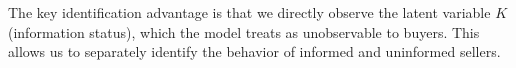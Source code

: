 The key identification advantage is that we directly observe the latent variable $K$ (information status), which the model treats as unobservable to buyers. This allows us to separately identify the behavior of informed and uninformed sellers.
